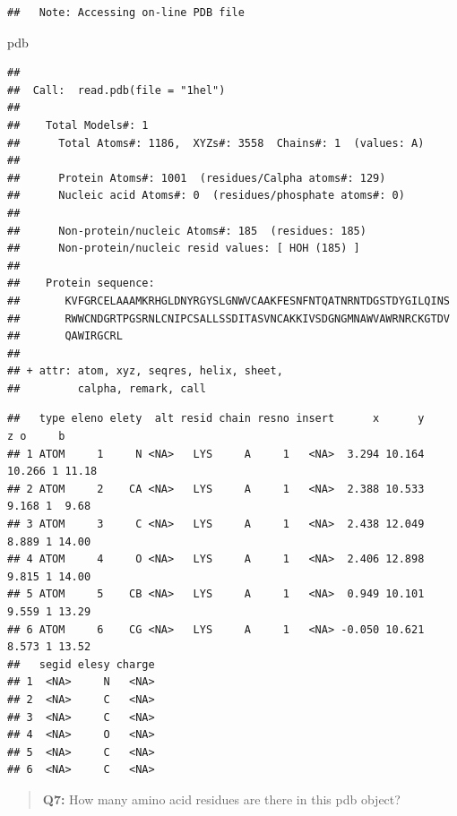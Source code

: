 \documentclass[
]{article}
\newenvironment{Shaded}{\begin{snugshade}}{\end{snugshade}}
\newcommand{\FunctionTok}[1]{\textcolor[rgb]{0.00,0.00,0.00}{#1}}
\newcommand{\NormalTok}[1]{#1}
\newcommand{\SpecialCharTok}[1]{\textcolor[rgb]{0.00,0.00,0.00}{#1}}
\begin{document}
\begin{verbatim}
##   Note: Accessing on-line PDB file
\end{verbatim}

\begin{Shaded}
\begin{Highlighting}[]
\NormalTok{pdb}
\end{Highlighting}
\end{Shaded}

\begin{verbatim}
## 
##  Call:  read.pdb(file = "1hel")
## 
##    Total Models#: 1
##      Total Atoms#: 1186,  XYZs#: 3558  Chains#: 1  (values: A)
## 
##      Protein Atoms#: 1001  (residues/Calpha atoms#: 129)
##      Nucleic acid Atoms#: 0  (residues/phosphate atoms#: 0)
## 
##      Non-protein/nucleic Atoms#: 185  (residues: 185)
##      Non-protein/nucleic resid values: [ HOH (185) ]
## 
##    Protein sequence:
##       KVFGRCELAAAMKRHGLDNYRGYSLGNWVCAAKFESNFNTQATNRNTDGSTDYGILQINS
##       RWWCNDGRTPGSRNLCNIPCSALLSSDITASVNCAKKIVSDGNGMNAWVAWRNRCKGTDV
##       QAWIRGCRL
## 
## + attr: atom, xyz, seqres, helix, sheet,
##         calpha, remark, call
\end{verbatim}

\begin{Shaded}
\end{Shaded}

\begin{verbatim}
##   type eleno elety  alt resid chain resno insert      x      y      z o     b
## 1 ATOM     1     N <NA>   LYS     A     1   <NA>  3.294 10.164 10.266 1 11.18
## 2 ATOM     2    CA <NA>   LYS     A     1   <NA>  2.388 10.533  9.168 1  9.68
## 3 ATOM     3     C <NA>   LYS     A     1   <NA>  2.438 12.049  8.889 1 14.00
## 4 ATOM     4     O <NA>   LYS     A     1   <NA>  2.406 12.898  9.815 1 14.00
## 5 ATOM     5    CB <NA>   LYS     A     1   <NA>  0.949 10.101  9.559 1 13.29
## 6 ATOM     6    CG <NA>   LYS     A     1   <NA> -0.050 10.621  8.573 1 13.52
##   segid elesy charge
## 1  <NA>     N   <NA>
## 2  <NA>     C   <NA>
## 3  <NA>     C   <NA>
## 4  <NA>     O   <NA>
## 5  <NA>     C   <NA>
## 6  <NA>     C   <NA>
\end{verbatim}

\begin{quote}
\textbf{Q7:} How many amino acid residues are there in this pdb object?
\end{quote}
\end{document}
